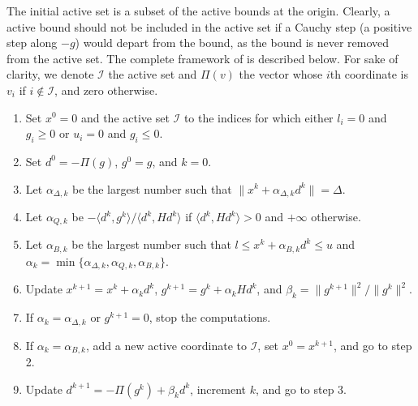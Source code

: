 \documentclass[letterpaper,10pt,english]{sphinxmanual}
\newcommand{\norm}[2][]{#1\lVert#2#1\rVert}
\newcommand{\set}[2][]{#1\{#2#1\}}
\newcommand{\inner}[2][]{#1\langle#2#1\rangle}
\begin{document}
\sphinxAtStartPar
The initial active set is a subset of the active bounds at the origin. Clearly,
a active bound should not be included in the active set if a Cauchy step (a
positive step along \(-g\)) would depart from the bound, as the bound is
never removed from the active set. The complete framework of  is
described below. For sake of clarity, we denote \(\mathcal{I}\) the active
set and \(\Pi(v)\) the vector whose \(i\)\sphinxhyphen{}th coordinate is \(v_i\)
if \(i \notin \mathcal{I}\), and zero otherwise.
\begin{enumerate}
%
\item {} 
\sphinxAtStartPar
Set \(x^0 = 0\) and the active set \(\mathcal{I}\) to the indices
for which either \(l_i = 0\) and \(g_i \ge 0\) or \(u_i = 0\)
and \(g_i \le 0\).

\item {} 
\sphinxAtStartPar
Set \(d^0 = -\Pi(g)\), \(g^0 = g\), and \(k = 0\).

\item {} 
\sphinxAtStartPar
Let \(\alpha_{\Delta, k}\) be the largest number such that
\(\norm{x^k + \alpha_{\Delta, k} d^k} = \Delta\).

\item {} 
\sphinxAtStartPar
Let \(\alpha_{Q, k}\) be \(-\inner{d^k, g^k} / \inner{d^k, Hd^k}\)
if \(\inner{d^k, Hd^k} > 0\) and \(+\infty\) otherwise.

\item {} 
\sphinxAtStartPar
Let \(\alpha_{B, k}\) be the largest number such that
\(l \le x^k + \alpha_{B, k} d^k \le u\) and
\(\alpha_k = \min \set{\alpha_{\Delta, k}, \alpha_{Q, k}, \alpha_{B, k}}\).

\item {} 
\sphinxAtStartPar
Update \(x^{k + 1} = x^k + \alpha_k d^k\),
\(g^{k + 1} = g^k + \alpha_k H d^k\), and
\(\beta_k = \norm{g^{k + 1}}^2 / \norm{g^k}^2\).

\item {} 
\sphinxAtStartPar
If \(\alpha_k = \alpha_{\Delta, k}\) or \(g^{k + 1} = 0\), stop the
computations.

\item {} 
\sphinxAtStartPar
If \(\alpha_k = \alpha_{B, k}\), add a new active coordinate to
\(\mathcal{I}\), set \(x^0 = x^{k + 1}\), and go to step 2.

\item {} 
\sphinxAtStartPar
Update \(d^{k + 1} = -\Pi(g^k) + \beta_k d^k\), increment \(k\), and
go to step 3.

\end{enumerate}
\end{document}
